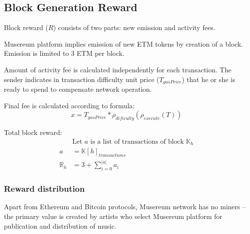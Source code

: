 \documentclass[12pt]{report}
\begin{document}
\begin{figure}[h]
\end{figure}

\vfill\null\pagebreak

\subsection{Block Generation Reward}
\label{tech-blockchain-reward}
\begin{multicols}{2}
Block reward ($R$) consists of two parts: new emission and activity fees.

Musereum platform implies emission of new ETM tokens by creation of a block. Emission is limited to 3 ETM per block.

Amount of activity fee is calculated independently for each transaction. The sender indicates in transaction difficulty unit price ($T_{gasPrice}$) that he or she is ready to spend to compensate network operation.

Final 	fee is calculated according to formula:
\begin{equation}
x = T_{gasPrice} * \rho_{dificulty}(\rho_{execute}(T))
\end{equation}

Total block reward:
\begin{align}
&\text{Let } a \text{ is a list of transactions of block } \mathbb{K}_h \\
a &= \mathbb{K}[h]_{transactions} \\
\mathbb{R}_h &= 3 + \sum\limits_{i=0}^{|a|} a_i
\end{align}
\end{multicols}

\subsubsection{Reward distribution}
\label{tech-blockchain-reward-distribution}
Apart from Ethereum and Bitcoin protocols, Musereum network has no miners – the primary value is created by artists who select Musereum platform for publication and distribution of music.
\end{document}
